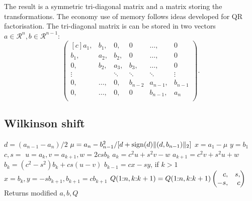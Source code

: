 \begin{refsection}
The result is a symmetric tri-diagonal matrix and a matrix storing
the transformations. The economy use of memory follows ideas developed
for QR factorisation. The tri-diagonal matrix is can be stored in
two vectors $a \in \mathcal{R}^n, b \in \mathcal{R}^{n-1}$:
\begin{equation}
  \begin{pmatrix*}[c]
    a_1, & b_1,   & 0,   & 0        & \ldots, & 0\\
    b_1, & a_2,   & b_2, & 0        & \ldots, & 0\\
    0,   & b_2,   & a_3, & b_3,     & \ldots, & 0\\
  \vdots & {}     & \ddots & \ddots & \ddots  & \vdots\\
    0,   & \dots, & 0,   & b_{n-2}  & a_{n-1}, & b_{n-1}\\
    0,   & \dots, & 0,   & 0       & b_{n-1}, & a_n\\
  \end{pmatrix*}.
\end{equation}



\subsection{Wilkinson shift}


\begin{algorithm}
  \caption{Implicit symmetric Francis QR step with Wilkinson shift}
  \label{alg:qrstep}
  \begin{algorithmic}
    \State {}

    \State $d = (a_{n-1} - a_n) / 2$
    \State $\mu = a_n - b_{n-1}^2 / [d + \operatorname{sign}(d) \lVert (d,b_{n-1}) \rVert_2]$
    \State $x = a_1 - \mu$
    \State $y = b_1$
    \State $c,s =$ 
    \State $u = a_k, v = a_{k+1}, w = 2 c s b_k$
    \State $a_k = c^2 u + s^2 v - w$
    \State $a_{k+1} = c^2 v + s^2 u + w$
    \State $b_k = (c^2 - s^2) b_k + cs(u-v)$
    \State $b_{k-1} = cx - sy$, if $k>1$
    \State $x = b_k, y = -sb_{k+1},b_{k+1} = c b_{k+1}$
    \EndIf
    \State $Q(\mdx{1}{n}, \mdx{k}{k+1}) = Q(\mdx{1}{n}, \mdx{k}{k+1}) \begin{pmatrix*}[r] c, & s,\\ -s, & c \end{pmatrix*}$
    \EndFor
    \State Returns modified $a,b,Q$
    \EndFunction
  \end{algorithmic}
\end{algorithm}


\end{refsection}
